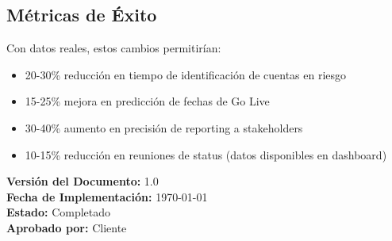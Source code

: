 \documentclass[12pt,a4paper]{article}
\begin{document}
\subsection{Métricas de Éxito}

Con datos reales, estos cambios permitirían:

\begin{itemize}
    \item 20-30\% reducción en tiempo de identificación de cuentas en riesgo
    \item 15-25\% mejora en predicción de fechas de Go Live
    \item 30-40\% aumento en precisión de reporting a stakeholders
    \item 10-15\% reducción en reuniones de status (datos disponibles en dashboard)
\end{itemize}

\vspace{1cm}

\noindent\textbf{Versión del Documento:} 1.0 \\
\textbf{Fecha de Implementación:} \today \\
\textbf{Estado:} Completado \\
\textbf{Aprobado por:} Cliente
\end{document}
